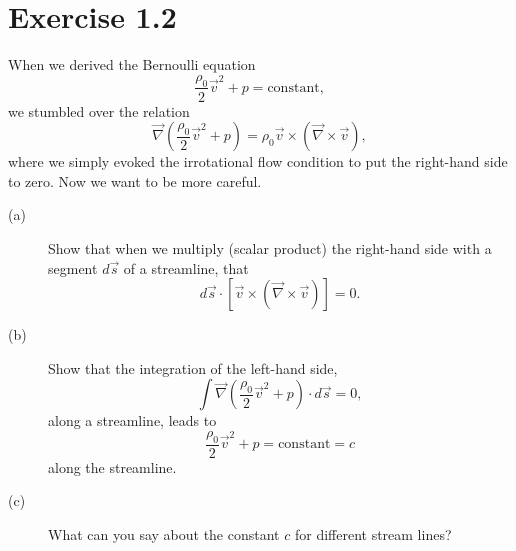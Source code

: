 \documentclass[a4paper, 10pt]{article}
\begin{document}
\section*{Exercise 1.2}
When we derived the Bernoulli equation
\begin{equation}
    \frac{\rho_0}{2}\vec{v}^2+p=\mathrm{constant},
\end{equation}
we stumbled over the relation
\begin{equation}
    \vec{\nabla}\left(\frac{\rho_0}{2}\vec{v}^2+p\right) = \rho_0\vec{v}\times\left(\vec{\nabla}\times\vec{v}\right),
\end{equation}
where we simply evoked the irrotational flow condition to put the right-hand side to zero. Now we want to be more careful.

\begin{description}
    \item[(a)]
        Show that when we multiply (scalar product) the right-hand side with a segment $d\vec{s}$ of a streamline, that
        \begin{equation}
            d\vec{s}\cdot\left[\vec{v}\times\left(\vec{\nabla}\times\vec{v}\right)\right]=0.
        \end{equation}

    \item[(b)]
        Show that the integration of the left-hand side,
        \begin{equation}
            \int\vec{\nabla}\left(\frac{\rho_0}{2}\vec{v}^2+p\right)\cdot d\vec{s} = 0,
        \end{equation}
        along a streamline, leads to
        \begin{equation}
            \frac{\rho_0}{2}\vec{v}^2+p=\mathrm{constant}=c
        \end{equation}
        along the streamline.

    \item[(c)]
        What can you say about the constant $c$ for different stream lines?
\end{description}
\end{document}
